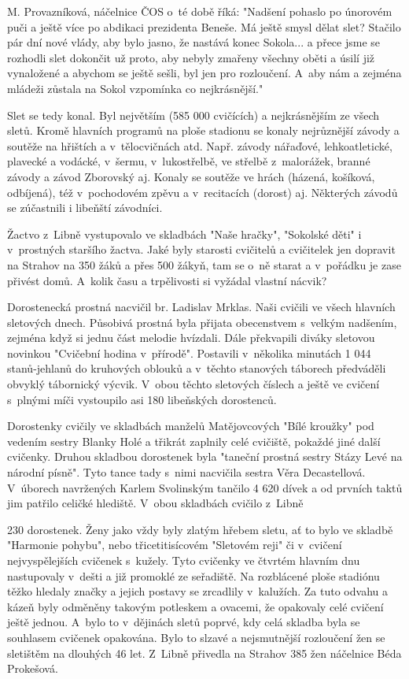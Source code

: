 \documentclass[a5paper, 12pt, twoside]{article}
\begin{document}
M. Provazníková, náčelnice ČOS o~té době říká: "Nadšení pohaslo po
únorovém puči a ještě více po abdikaci prezidenta Beneše. Má ještě smysl
dělat slet? Stačilo pár dní nové vlády, aby bylo jasno, že nastává konec
Sokola... a přece jsme se rozhodli slet dokončit už proto, aby nebyly
zmařeny všechny oběti a úsilí již vynaložené a abychom se ještě sešli,
byl jen pro rozloučení. A~aby nám a zejména mládeži zůstala na Sokol
vzpomínka co nejkrásnější."

Slet se tedy konal. Byl největším (585 000 cvičících) a nejkrásnějším ze
všech sletů. Kromě hlavních programů na ploše stadionu se konaly
nejrůznější závody a soutěže na hřištích a v~tělocvičnách atd. Např.
závody nářaďové, lehkoatletické, plavecké a vodácké, v~šermu,
v~lukostřelbě, ve střelbě z~malorážek, branné závody a závod Zborovský aj.
Konaly se soutěže ve hrách (házená, košíková, odbíjená), též
v~pochodovém zpěvu a v~recitacích (dorost) aj. Některých závodů se
zúčastnili i libeňští závodníci.

Žactvo z~Libně vystupovalo ve skladbách "Naše hračky", "Sokolské děti"
i v~prostných staršího žactva. Jaké byly starosti cvičitelů a cvičitelek
jen dopravit na Strahov na 350 žáků a přes 500 žákyň, tam se o~ně starat
a v~pořádku je zase přivést domů. A~kolik času a trpělivosti si vyžádal
vlastní nácvik?

Dorostenecká prostná nacvičil br. Ladislav Mrklas. Naši cvičili ve všech
hlavních sletových dnech. Působivá prostná byla přijata obecenstvem
s~velkým nadšením, zejména když si jednu část melodie hvízdali. Dále
překvapili diváky sletovou novinkou "Cvičební hodina v~přírodě".
Postavili v~několika minutách 1 044 stanů-jehlanů do kruhových oblouků a
v~těchto stanových táborech předváděli obvyklý tábornický výcvik. V~obou
těchto sletových číslech a ještě ve cvičení s~plnými míči vystoupilo asi
180 libeňských dorostenců.

Dorostenky cvičily ve skladbách manželů Matějovcových "Bílé kroužky"
pod vedením sestry Blanky Holé a třikrát zaplnily celé cvičiště, pokaždé
jiné další cvičenky. Druhou skladbou dorostenek byla "taneční prostná
sestry Stázy Levé na národní písně". Tyto tance tady s~nimi nacvičila
sestra Věra Decastellová. V~úborech navržených Karlem Svolinským tančilo
4 620 dívek a od prvních taktů jim patřilo celičké hlediště. V~obou
skladbách cvičilo z~Libně

230 dorostenek. Ženy jako vždy byly zlatým hřebem sletu, ať to bylo ve
skladbě "Harmonie pohybu", nebo třicetitisícovém "Sletovém reji" či
v~cvičení nejvyspělejších cvičenek s~kužely. Tyto cvičenky ve čtvrtém
hlavním dnu nastupovaly v~dešti a již promoklé ze seřadiště. Na
rozblácené ploše stadiónu těžko hledaly značky a jejich postavy se
zrcadlily v~kalužích. Za tuto odvahu a kázeň byly odměněny takovým
potleskem a ovacemi, že opakovaly celé cvičení ještě jednou. A~bylo to
v~dějinách sletů poprvé, kdy celá skladba byla se souhlasem cvičenek
opakována. Bylo to slzavé a nejsmutnější rozloučení žen se sletištěm na
dlouhých 46 let. Z~Libně přivedla na Strahov 385 žen náčelnice Béda
Prokešová.
\end{document}
